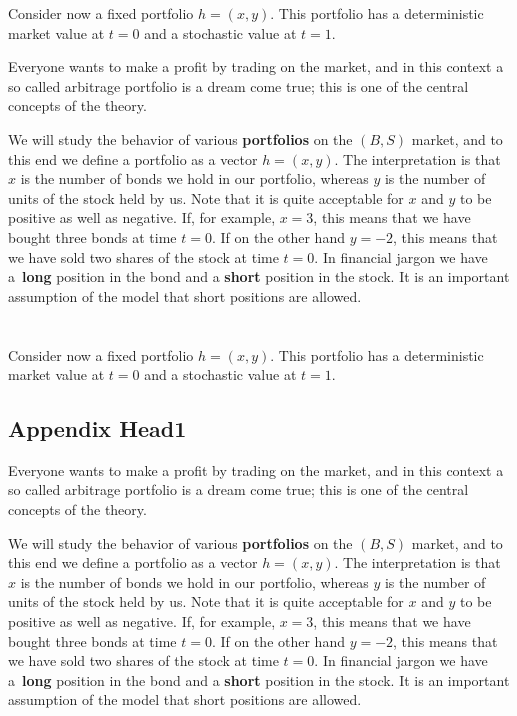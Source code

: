 \documentclass{Base}
\begin{document}
Consider now a fixed portfolio $h=(x,y)$. This portfolio has a
deterministic market value at $t=0$ and a stochastic value at
$t=1$.

Everyone wants to make a profit by trading on the market, and in
this context a so called arbitrage portfolio is a dream come true;
this is one of the central concepts of the theory.

We will study the behavior of various {\bf portfolios}
 on the $(B,S)$
market, and to this end we define a portfolio as a vector
$h=(x,y)$. The interpretation is that $x$ is the number of bonds
we hold in our portfolio, whereas $y$ is the number of units of
the stock held by us. Note that it is quite acceptable for $x$ and
$y$ to be positive as well as negative. If, for example, $x=3$,
this means that we have bought three bonds at time $t=0$. If on
the other hand $y=-2$, this means that we have sold two shares of
the stock at time $t=0$. In financial jargon we have a~{\bf long}
position in the bond and a {\bf short} position in the stock. It
is an important assumption of the model that short positions are
allowed.

\chapter{}

Consider now a fixed portfolio $h=(x,y)$. This portfolio has a
deterministic market value at $t=0$ and a stochastic value at
$t=1$.

\section{Appendix Head1}

Everyone wants to make a profit by trading on the market, and in
this context a so called arbitrage portfolio is a dream come true;
this is one of the central concepts of the theory.

We will study the behavior of various {\bf portfolios}
 on the $(B,S)$
market, and to this end we define a portfolio as a vector
$h=(x,y)$. The interpretation is that $x$ is the number of bonds
we hold in our portfolio, whereas $y$ is the number of units of
the stock held by us. Note that it is quite acceptable for $x$ and
$y$ to be positive as well as negative. If, for example, $x=3$,
this means that we have bought three bonds at time $t=0$. If on
the other hand $y=-2$, this means that we have sold two shares of
the stock at time $t=0$. In financial jargon we have a~{\bf long}
position in the bond and a {\bf short} position in the stock. It
is an important assumption of the model that short positions are
allowed.
\end{document}
